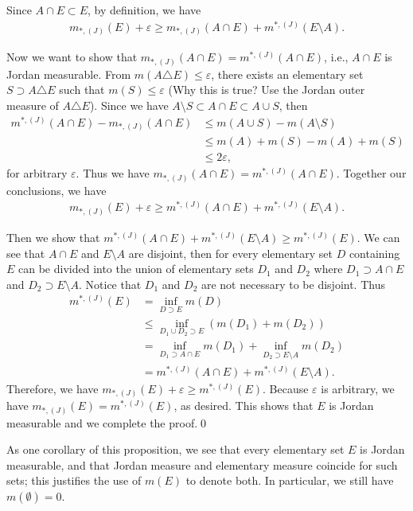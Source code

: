 \documentclass{book}
\theoremstyle{defstyle}
\theoremstyle{thmstyle}
\newcommand{\JIM}{m_{*, (J)}}%
\newcommand{\JOM}{m^{*, (J)}}%
\begin{document}
Since $A \cap E \subset E$, by definition, we have
    \begin{align*}
        \JIM(E) + \varepsilon
        \geq \JIM(A \cap E) + \JOM(E \setminus A).
    \end{align*}

Now we want to show that $\JIM(A \cap E) = \JOM(A \cap E)$, i.e., $A \cap E$ is Jordan measurable. From $m(A \triangle E) \leq \varepsilon$, there exists an elementary set $S \supset A \triangle E$ such that $m(S) \leq \varepsilon$ (Why this is true? Use the Jordan outer measure of $A \triangle E$). Since we have $A \setminus S \subset A \cap E \subset A \cup S$, then
    \begin{align*}
        \JOM(A \cap E) - \JIM(A \cap E)
        &\leq m(A \cup S) - m(A \setminus S)\\
        &\leq m(A) + m(S) - m(A) + m(S)\\
        &\leq 2\varepsilon,
    \end{align*}
for arbitrary $\varepsilon$. Thus we have $\JIM(A \cap E) = \JOM(A \cap E)$. Together our conclusions, we have
    \begin{align*}
        \JIM(E) + \varepsilon
        \geq \JOM(A \cap E) + \JOM(E \setminus A).
    \end{align*}

Then we show that $\JOM(A \cap E) + \JOM(E \setminus A) \geq \JOM(E)$. We can see that $A \cap E$ and $E \setminus A$ are disjoint, then for every elementary set $D$ containing $E$ can be divided into the union of elementary sets $D_1$ and $D_2$ where $D_1 \supset A \cap E$ and $D_2 \supset E \setminus A$. Notice that $D_1$ and $D_2$ are not necessary to be disjoint. Thus
    \begin{align*}
        \JOM(E)
        &= \inf_{D \supset E} m(D)\\
        &\leq \inf_{D_1 \cup D_2 \supset E}(m(D_1) + m(D_2))\\
        &= \inf_{D_1 \supset A \cap E}m(D_1) + \inf_{D_2 \supset E \setminus A}m(D_2)\\
        &= \JOM(A \cap E) + \JOM(E \setminus A).
    \end{align*}
Therefore, we have $\JIM(E) + \varepsilon \geq \JOM(E)$. Because $\varepsilon$ is arbitrary, we have $\JIM(E) = \JOM(E)$, as desired. This shows that $E$ is Jordan measurable and we complete the proof.\qed

\begin{remark}
    As one corollary of this proposition, we see that every elementary set $E$ is Jordan measurable, and that Jordan measure and elementary measure coincide for such sets; this justifies the use of $m(E)$ to denote both. In particular, we still have $m(\emptyset) = 0$.
\end{remark}
\end{document}
